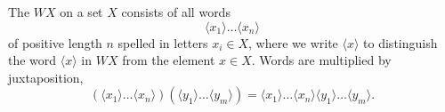 The  $WX$ on a set $X$ consists of all words
$$\langle x_1 \rangle \ldots \langle x_n \rangle$$
of positive length $n$ spelled in letters $x_i \in X$, where we write $\langle x \rangle$ to distinguish the word $\langle x \rangle$ in $WX$ from the element $x \in X$. Words are multiplied by juxtaposition,
$$(\langle x_1 \rangle \ldots \langle x_n \rangle)(\langle y_1 \rangle \ldots \langle y_m \rangle) = \langle x_1 \rangle \ldots \langle x_n \rangle \langle y_1 \rangle \ldots \langle y_m \rangle.$$
